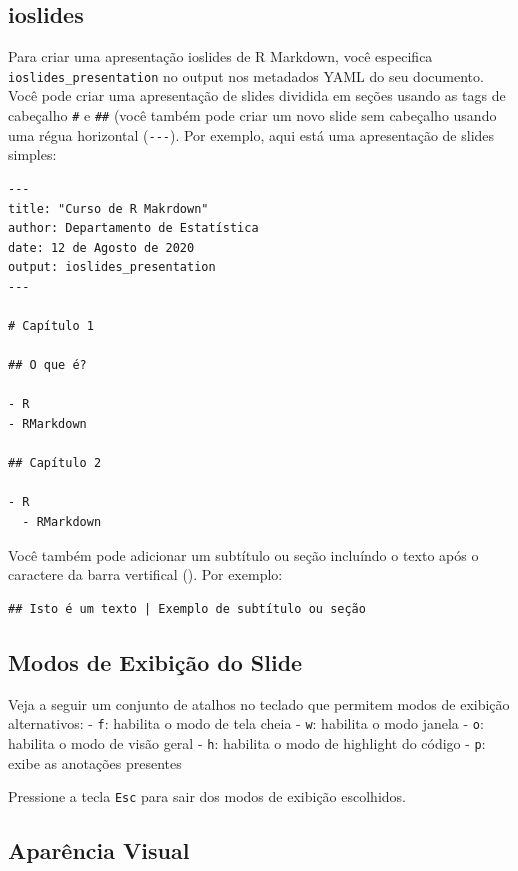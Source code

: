 \documentclass[
]{book}
\begin{document}
\hypertarget{ioslides}{%
\subsection{ioslides}\label{ioslides}}

Para criar uma apresentação ioslides de R Markdown, você especifica \texttt{ioslides\_presentation} no output nos metadados YAML do seu documento. Você pode criar uma apresentação de slides dividida em seções usando as tags de cabeçalho \texttt{\#} e \texttt{\#\#} (você também pode criar um novo slide sem cabeçalho usando uma régua horizontal (\texttt{-\/-\/-}). Por exemplo, aqui está uma apresentação de slides simples:

\begin{verbatim}
---
title: "Curso de R Makrdown"
author: Departamento de Estatística
date: 12 de Agosto de 2020
output: ioslides_presentation
---

# Capítulo 1

## O que é?

- R
- RMarkdown

## Capítulo 2

- R
  - RMarkdown
\end{verbatim}

Você também pode adicionar um subtítulo ou seção incluíndo o texto após o caractere da barra vertifical (\texttt{\textbar{}}). Por exemplo:

\begin{verbatim}
## Isto é um texto | Exemplo de subtítulo ou seção
\end{verbatim}

\hypertarget{modos-de-exibiuxe7uxe3o-do-slide}{%
\subsection{Modos de Exibição do Slide}\label{modos-de-exibiuxe7uxe3o-do-slide}}

Veja a seguir um conjunto de atalhos no teclado que permitem modos de exibição alternativos:
- \texttt{f}: habilita o modo de tela cheia
- \texttt{w}: habilita o modo janela
- \texttt{o}: habilita o modo de visão geral
- \texttt{h}: habilita o modo de highlight do código
- \texttt{p}: exibe as anotações presentes

Pressione a tecla \texttt{Esc} para sair dos modos de exibição escolhidos.

\hypertarget{aparuxeancia-visual}{%
\subsection{Aparência Visual}\label{aparuxeancia-visual}}
\end{document}
